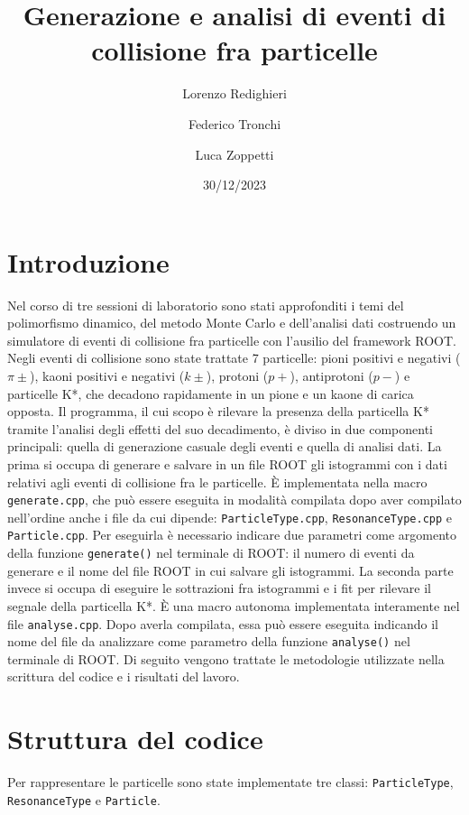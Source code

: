 \documentclass{article}
\title{Generazione e analisi di eventi di collisione fra particelle}
\author{Lorenzo Redighieri \and Federico Tronchi \and Luca Zoppetti}
\date{30/12/2023}
\begin{document}
\maketitle

\section{Introduzione}

Nel corso di tre sessioni di laboratorio sono stati approfonditi i temi del polimorfismo dinamico, del metodo Monte Carlo e dell'analisi dati costruendo un simulatore di eventi di collisione fra particelle con l'ausilio del framework ROOT. Negli eventi di collisione sono state trattate 7 particelle: pioni positivi e negativi ($\pi\pm$), kaoni positivi e negativi ($k\pm$), protoni ($p+$), antiprotoni ($p-$) e particelle K*, che decadono rapidamente in un pione e un kaone di carica opposta. Il programma, il cui scopo è rilevare la presenza della particella K* tramite l'analisi degli effetti del suo decadimento, è diviso in due componenti principali: quella di generazione casuale degli eventi e quella di analisi dati. La prima si occupa di generare e salvare in un file ROOT gli istogrammi con i dati relativi agli eventi di collisione fra le particelle. È implementata nella macro \verb|generate.cpp|, che può essere eseguita in modalità compilata dopo aver compilato nell'ordine anche i file da cui dipende: \verb|ParticleType.cpp|, \verb|ResonanceType.cpp| e \verb|Particle.cpp|. Per eseguirla è necessario indicare due parametri come argomento della funzione \verb|generate()| nel terminale di ROOT: il numero di eventi da generare e il nome del file ROOT in cui salvare gli istogrammi. La seconda parte invece si occupa di eseguire le sottrazioni fra istogrammi e i fit per rilevare il segnale della particella K*. È una macro autonoma implementata interamente nel file \verb|analyse.cpp|. Dopo averla compilata, essa può essere eseguita indicando il nome del file da analizzare come parametro della funzione \verb|analyse()| nel terminale di ROOT. Di seguito vengono trattate le metodologie utilizzate nella scrittura del codice e i risultati del lavoro.

\section{Struttura del codice}
Per rappresentare le particelle sono state implementate tre classi: \verb|ParticleType|, \verb|ResonanceType| e \verb|Particle|.
\end{document}
